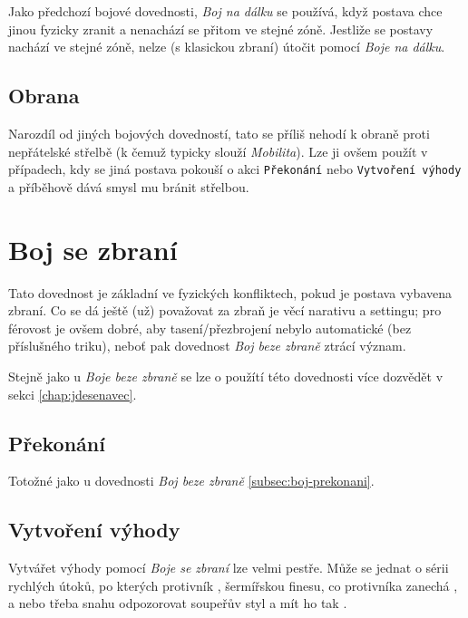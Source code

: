 \documentclass[../main.tex]{subfiles}
\begin{document}
Jako předchozí bojové dovednosti, \textit{Boj na dálku} se používá, když postava chce jinou fyzicky zranit a nenachází se přitom ve stejné zóně. Jestliže se postavy nachází ve stejné zóně, nelze (s klasickou zbraní) útočit pomocí \textit{Boje na dálku}.

\subsection*{Obrana}
\label{subsec:dboj-obrana}
\obrana

Narozdíl od jiných bojových dovedností, tato se příliš nehodí k obraně proti nepřátelské střelbě (k čemuž typicky slouží \textit{Mobilita}). Lze ji ovšem použít v případech, kdy se jiná postava pokouší o akci \texttt{Překonání} nebo \texttt{Vytvoření výhody} a příběhově dává smysl mu bránit střelbou.

\section{Boj se zbraní}
\label{sec:bojsezbrani}

Tato dovednost je základní ve fyzických konfliktech, pokud je postava vybavena zbraní. Co se dá ještě (už) považovat za zbraň je věcí narativu a settingu; pro férovost je ovšem dobré, aby tasení/přezbrojení nebylo automatické (bez příslušného triku), neboť pak dovednost \textit{Boj beze zbraně} ztrácí význam.

Stejně jako u \textit{Boje beze zbraně} se lze o použítí této dovednosti více dozvědět v sekci \ref{chap:jdesenavec}.

\subsection*{Překonání}
\label{subsec:zboj-prekonani}
\prekonani

Totožné jako u dovednosti \textit{Boj beze zbraně} \ref{subsec:boj-prekonani}.

\subsection*{Vytvoření výhody}
\label{subsec:zboj-vytvoreni}
\vytvoreni

Vytvářet výhody pomocí \textit{Boje se zbraní} lze velmi pestře. Může se jednat o sérii rychlých útoků, po kterých protivník , šermířskou finesu, co protivníka zanechá , a nebo třeba snahu odpozorovat soupeřův styl a mít ho tak . 
\end{document}
